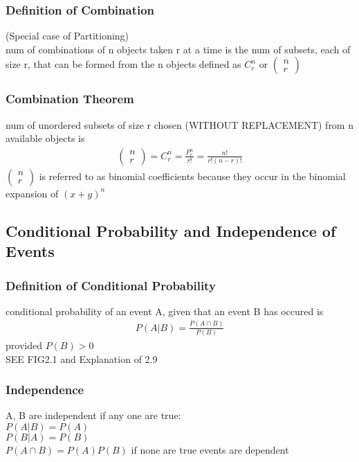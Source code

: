 \documentclass[12pt]{article}
\begin{document}
    \subsubsection{Definition of Combination}
        (Special case of Partitioning) \\
        num of combinations of n objects taken r at a time is 
        the num of subsets, each of size r, that can be formed from the
        n objects defined as $ C^{n}_{r}\text{ or } \begin{pmatrix}
        n\\r\end{pmatrix}$
    \subsubsection{Combination Theorem}
        num of unordered subsets of size r chosen (WITHOUT REPLACEMENT) from
        n available objects is 
        \begin{align*}
            \begin{pmatrix}
                n\\r
            \end{pmatrix}
            = C_{r}^{n} = \frac{P_{r}^{n}}{r!} = \frac{n!}{r!(n-r)!} 
        \end{align*}
        $ \begin{pmatrix}n\\r\end{pmatrix} $ is referred to as binomial 
        coefficients because they occur in the binomial expansion of
        $ (x + y)^{n} $
\subsection{Conditional Probability and Independence of Events}
    \subsubsection{Definition of Conditional Probability}
        conditional probability of an event A, given that an event B
        has occured is
        \begin{align*}
            P(A|B) = \frac{P(A\cap B)}{P(B)} 
        \end{align*}
        provided $ P(B) > 0 $\\
        SEE FIG2.1 and Explanation of 2.9
    \subsubsection{Independence}
        A, B are independent if any one are true:\\
        $ P(A|B) = P(A) $\\
        $ P(B|A) = P(B) $\\
        $ P(A\cap B) = P(A)P(B) $
        if none are true events are dependent
\end{document}
